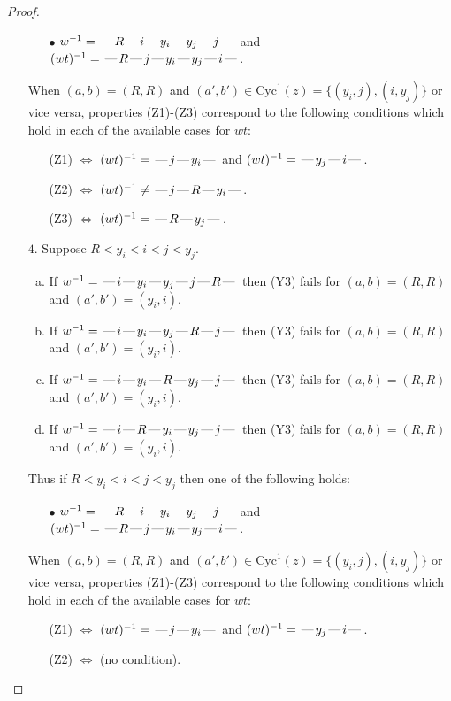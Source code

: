 \documentclass[10pt]{article}
\theoremstyle{definition}
\theoremstyle{definition}
\def\dash{\text{\hspace{0.5mm}---\hspace{0.5mm}}}
\def\Cyc{\mathrm{Cyc}}
\begin{document}
\begin{proof}
\begin{enumerate}
\begin{enumerate}
\item[$\bullet$] $w^{-1} = \dash R\dash i\dash y_i\dash y_j\dash j\dash $ and $(wt)^{-1} = \dash R\dash j\dash y_i\dash y_j\dash i\dash $.
\end{enumerate}
When $(a,b)= (R,R)$ and $(a',b')\in \Cyc^1(z)=\{(y_i,j),(i,y_j)\}$ or vice versa,
properties (Z1)-(Z3) correspond to the following conditions which
hold in each of the available cases for $wt$:
\begin{enumerate}
\item[](Z1) $\Leftrightarrow$ $(wt)^{-1} = \dash j \dash y_i \dash$  and $(wt)^{-1} = \dash y_j \dash i \dash$.
\item[](Z2) $\Leftrightarrow$ $(wt)^{-1} \neq \dash j \dash R \dash y_i \dash$.
\item[](Z3) $\Leftrightarrow$ $(wt)^{-1} = \dash R \dash y_j \dash$.
\end{enumerate}
\item[$4$.] Suppose $R < y_i < i < j < y_j$.
\begin{enumerate}[(a)]
\item If $w^{-1} = \dash i\dash y_i\dash y_j\dash j\dash R\dash $ then (Y3) fails for $(a,b)=(R,R)$ and $(a',b')=(y_i,i)$.
\item If $w^{-1} = \dash i\dash y_i\dash y_j\dash R\dash j\dash $ then (Y3) fails for $(a,b)=(R,R)$ and $(a',b')=(y_i,i)$.
\item If $w^{-1} = \dash i\dash y_i\dash R\dash y_j\dash j\dash $ then (Y3) fails for $(a,b)=(R,R)$ and $(a',b')=(y_i,i)$.
\item If $w^{-1} = \dash i\dash R\dash y_i\dash y_j\dash j\dash $ then (Y3) fails for $(a,b)=(R,R)$ and $(a',b')=(y_i,i)$.
\end{enumerate}
Thus if $R < y_i < i < j < y_j$ then one of the following holds:
\begin{enumerate}
\item[$\bullet$] $w^{-1} = \dash R\dash i\dash y_i\dash y_j\dash j\dash $ and $(wt)^{-1} = \dash R\dash j\dash y_i\dash y_j\dash i\dash $.
\end{enumerate}
When $(a,b)= (R,R)$ and $(a',b')\in \Cyc^1(z)=\{(y_i,j),(i,y_j)\}$ or vice versa,
properties (Z1)-(Z3) correspond to the following conditions which
hold in each of the available cases for $wt$:
\begin{enumerate}
\item[](Z1) $\Leftrightarrow$ $(wt)^{-1} = \dash j \dash y_i \dash$  and $(wt)^{-1} = \dash y_j \dash i \dash$.
\item[](Z2) $\Leftrightarrow$ (no condition).

\end{enumerate}
\end{enumerate}
\end{proof}
\end{document}
